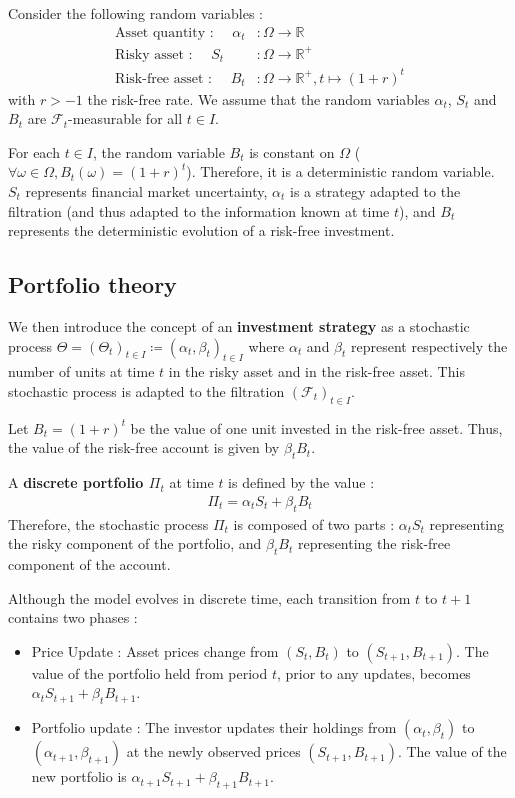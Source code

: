 Consider the following random variables :
\begin{align*}
    \text{Asset quantity : } \quad \alpha_t& : \Omega \to \mathbb{R} \\
    \text{Risky asset : } \quad S_t& : \Omega \to \mathbb{R}^+ \\
    \text{Risk-free asset : } \quad B_t& : \Omega \to \mathbb{R}^+, t \mapsto (1+r)^t
\end{align*}
with $r>-1$ the risk-free rate.
We assume that the random variables $\alpha_t$, $S_t$ and $B_t$ are $\mathcal{F}_t$-measurable for all $t \in I$.

\remark For each $t \in I$, the random variable $B_t$ is constant on $\Omega$ ($\forall \omega \in \Omega, B_t(\omega)=(1+r)^t$).
Therefore, it is a deterministic random variable.
$S_t$ represents financial market uncertainty, $\alpha_t$ is a strategy adapted to the filtration (and thus adapted to the information known at time $t$), and $B_t$ represents the deterministic evolution of a risk-free investment.



\pagebreak



\subsection{Portfolio theory}

We then introduce the concept of an \textbf{investment strategy} as a stochastic process $\Theta = (\Theta_t)_{t \in I} \coloneq (\alpha_t, \beta_t)_{t \in I}$
where $\alpha_t$ and $\beta_t$ represent respectively the number of units at time $t$ in the risky asset and in the risk-free asset.
This stochastic process is adapted to the filtration $(\mathcal{F}_t)_{t \in I}$.

Let $B_t = (1+r)^t$ be the value of one unit invested in the risk-free asset.
Thus, the value of the risk-free account is given by $\beta_t B_t$.

A \textbf{discrete portfolio $\Pi_t$} at time $t$ is defined by the value : 
\begin{align*}
    \Pi_t = \alpha_tS_t+\beta_tB_t 
\end{align*}
Therefore, the stochastic process $\Pi_t$ is composed of two parts : $\alpha_tS_t$ representing the risky component of the portfolio,
and $\beta_tB_t$ representing the risk-free component of the account. \cite{Portfolio}

Although the model evolves in discrete time, each transition from $t$ to $t+1$ contains two phases : 
\begin{itemize}
    \item Price Update : Asset prices change from $(S_t,B_t)$ to $(S_{t+1},B_{t+1})$. 
    The value of the portfolio held from period $t$, prior to any updates, becomes $\alpha_tS_{t+1}+\beta_tB_{t+1}$.
    \item Portfolio update : The investor updates their holdings from $(\alpha_t,\beta_t)$ to $(\alpha_{t+1}, \beta_{t+1})$ at the newly observed prices $(S_{t+1},B_{t+1})$.
    The value of the new portfolio is $\alpha_{t+1}S_{t+1} + \beta_{t+1}B_{t+1}$.
\end{itemize}

